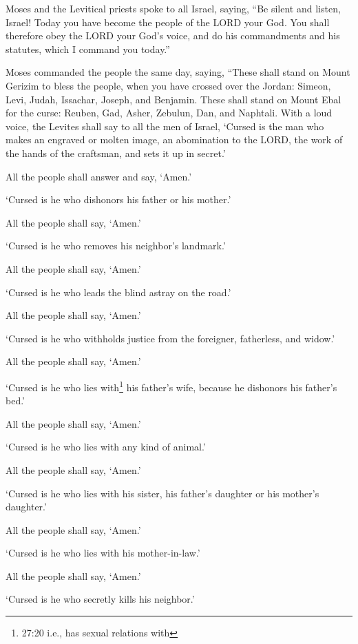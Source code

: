 \myverse{}Moses and the Levitical priests spoke to all Israel, saying, “Be
silent and listen, Israel! Today you have become the people of the LORD your God.
\myverse{}You shall therefore obey the LORD your God’s voice, and do his commandments
and his statutes, which I command you today.”

\myverse{}Moses commanded the people the same day, saying,
\myverse{}“These shall stand on Mount Gerizim to bless the people, when you have crossed
over the Jordan: Simeon, Levi, Judah, Issachar, Joseph, and Benjamin.
\myverse{}These shall stand on Mount Ebal for the curse: Reuben, Gad, Asher, Zebulun,
Dan, and Naphtali.
\myverse{}With a loud voice, the Levites shall say to all the men of Israel,
\myverse{}‘Cursed is the man who makes an engraved or molten image, an abomination
to the LORD, the work of the hands of the craftsman, and sets it up in secret.’

All the people shall answer and say, ‘Amen.’

\myverse{}‘Cursed is he who dishonors his father or his mother.’

All the people shall say, ‘Amen.’

\myverse{}‘Cursed is he who removes his neighbor’s landmark.’

All the people shall say, ‘Amen.’

\myverse{}‘Cursed is he who leads the blind astray on the road.’

All the people shall say, ‘Amen.’

\myverse{}‘Cursed is he who withholds justice from the foreigner, fatherless,
and widow.’

All the people shall say, ‘Amen.’

\myverse{}‘Cursed is he who lies with\footnote{27:20 i.e., has sexual relations with} his father’s wife, because he dishonors his father’s
bed.’

All the people shall say, ‘Amen.’

\myverse{}‘Cursed is he who lies with any kind of animal.’

All the people shall say, ‘Amen.’

\myverse{}‘Cursed is he who lies with his sister, his father’s daughter
or his mother’s daughter.’

All the people shall say, ‘Amen.’

\myverse{}‘Cursed is he who lies with his mother-in-law.’

All the people shall say, ‘Amen.’

\myverse{}‘Cursed is he who secretly kills his neighbor.’

